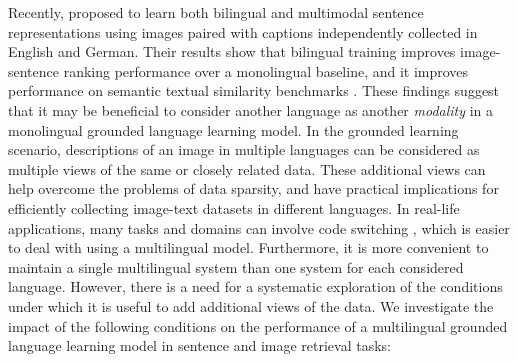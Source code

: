 Recently, \citet{gella2017image} proposed to learn both bilingual and multimodal sentence representations using images paired with captions independently collected in English and German. Their results show that bilingual training improves image-sentence ranking performance over a monolingual baseline, and it improves performance on semantic textual similarity benchmarks \citep{agirre2014semeval,agirre2015semeval}. These findings suggest that it may be beneficial to consider another language as another {\it modality} in a monolingual grounded language learning model. In the grounded learning scenario, descriptions of an image in multiple languages can be considered as multiple views of the same or closely related data. These additional views can help overcome the problems of data sparsity, and have practical implications for efficiently collecting image-text datasets in different languages. In real-life applications, many tasks and domains can involve code switching \cite{barman2014code}, which is easier to deal with using a multilingual model. Furthermore, it is more convenient to maintain a single multilingual system than one system for each considered language. However, there is a need for a systematic exploration of the
conditions under which it is useful to add additional views of the data. We investigate the impact of the following conditions on the performance of a multilingual grounded language learning model in sentence and image retrieval tasks:
%
